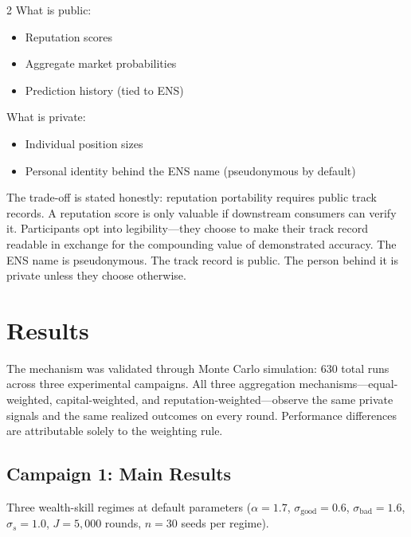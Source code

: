 \documentclass[9pt,oneside]{amsart}
\begin{document}
\begin{multicols}{2}
What is public:
\begin{itemize}[nosep]
  \item Reputation scores
  \item Aggregate market probabilities
  \item Prediction history (tied to ENS)
\end{itemize}

What is private:
\begin{itemize}[nosep]
  \item Individual position sizes
  \item Personal identity behind the ENS name (pseudonymous by default)
\end{itemize}

The trade-off is stated honestly: reputation portability requires public track records. A reputation score is only valuable if downstream consumers can verify it. Participants opt into legibility---they choose to make their track record readable in exchange for the compounding value of demonstrated accuracy. The ENS name is pseudonymous. The track record is public. The person behind it is private unless they choose otherwise.

\section{Results}

The mechanism was validated through Monte Carlo simulation: 630 total runs across three experimental campaigns. All three aggregation mechanisms---equal-weighted, capital-weighted, and reputation-weighted---observe the same private signals and the same realized outcomes on every round. Performance differences are attributable solely to the weighting rule.

\end{multicols}


\subsection{Campaign 1: Main Results}

Three wealth-skill regimes at default parameters ($\alpha = 1.7$, $\sigma_{\text{good}} = 0.6$, $\sigma_{\text{bad}} = 1.6$, $\sigma_s = 1.0$, $J = 5{,}000$ rounds, $n = 30$ seeds per regime).
\end{document}
